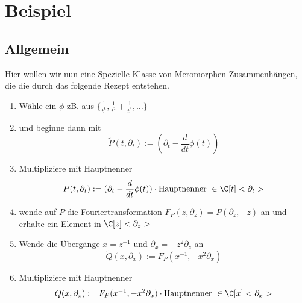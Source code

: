 \chapter{Beispiel}

\section{Allgemein} \label{sec:allgemeinProblem}

\begin{comment}
siehe: \cite[5.b]{sabbah_Fourier-local}
\end{comment}

\begin{comment}
sei $\phi\in\{\frac{1}{t^k},\frac{1}{t^2}+\frac{1}{t^3},\dots\}$
\begin{enumerate}
\item Starte mit: $P(t,\partial_t):=(\partial_t-\frac{d}{dt}\phi(t)) \cdot
\mbox{Hauptnenner }\in\C[t]<\partial_t>$
\item Furiertrafo: $F_P(z,\partial_z)=P(\partial_z,-z)\in\C[z]<\partial_z>$
\item $x=z^{-1}$ und $\partial_x=-z^2\partial_z$ \\
\[
Q(x,\partial_x):=F_P(x^{-1},-x^2\partial_x)\cdot \mbox{Hauptnenner
}\in\C[x]<\partial_x>
\]
\item Berechne für $Q$ das NP usw...
\end{enumerate}
\end{comment}

Hier wollen wir nun eine Spezielle Klasse von Meromorphen Zusammenhängen, die
die durch das folgende Rezept entstehen.
\begin{enumerate}
\item Wähle ein $\phi$ zB. aus
$\{\frac{1}{t^k},\frac{1}{t^2}+\frac{1}{t^3},\dots\}$
\item und beginne dann mit
\[
\tilde P(t,\partial_t):=(\partial_t-\frac{d}{dt}\phi(t))
\]
\item Multipliziere mit Hauptnenner
\[
P(t,\partial_t):=(\partial_t-\frac{d}{dt}\phi(t)) \cdot
\mbox{Hauptnenner }\in\C[t]<\partial_t>
\]
\item wende auf $P$ die Fouriertransformation 
$F_P(z,\partial_z)=P(\partial_z,-z)$ an und erhalte ein Element
in $\C[z]<\partial_z>$
\item Wende die Übergänge $x=z^{-1}$ und $\partial_x=-z^2\partial_z$ an 
\[
\tilde Q(x,\partial_x):=F_P(x^{-1},-x^2\partial_x)
\]
\item Multipliziere mit Hauptnenner
\[
Q(x,\partial_x):=F_P(x^{-1},-x^2\partial_x)\cdot \mbox{Hauptnenner
}\in\C[x]<\partial_x>
\]
\end{enumerate}

